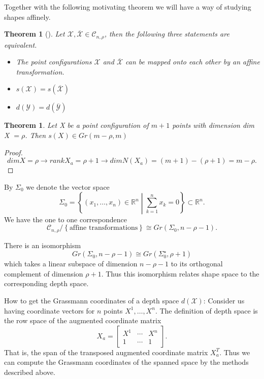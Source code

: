 \documentclass[a4paper,12pt]{book}
\theoremstyle{plain}
\newtheorem{thm}[equation]{Theorem}
\theoremstyle{definition}
\begin{document}
Together with the following motivating theorem we will have a way of studying shapes affinely.
\begin{thm}[\cite{sparr1998}]
	Let \( \mathcal{X}, \overline{\mathcal{X}} \in \mathcal{C}_{n, \rho}\),
	then the following three
	statements are equivalent.
	\begin{itemize}
		\item The point configurations \( \mathcal{X} \) and \( \overline{\mathcal{X}} \) can be
		mapped onto each other by an affine transformation.
		\item \( s(\mathcal{X}) = s(\mathcal{\overline{X}}) \)
		\item \(  d(\mathcal{Y}) =  d(\mathcal{\overline{Y}}) \)
	\end{itemize}
\end{thm}
\begin{thm}
	Let X be a point configuration of \( m + 1 \) points with dimension
	dim X \( = \rho \). Then \( s(X) \in Gr(m - \rho, m) \)
\end{thm}
\begin{proof}
	\[
		dim X = \rho \rightarrow rank X_a = \rho + 1 \rightarrow
		dim N(X_a) = (m + 1) - (\rho + 1) = m - \rho.
	\]
\end{proof}
By \( \Sigma_0 \) we denote the vector space
\[
	\Sigma_0 = \left\{ ( x_1, \ldots, x_n ) \in \mathbb{R}^n \middle| \sum_{k=1}^n x_k = 0 \right\}
	\subset \mathbb{R}^n .
\]
We have the one to one correspondence
\[
	\mathcal{C}_{n,\rho} / \left\{\text{affine transformations} \right\}
	\cong Gr(\Sigma_0, n - \rho - 1).
\]

There is an isomorphism
\[
	Gr(\Sigma_0, n - \rho - 1) \cong Gr(\Sigma_0^\star, \rho + 1)
\]
which takes a linear subspace of dimension \( n - \rho - 1 \) 
to its orthogonal complement of
dimension \( \rho + 1 \).
Thus this isomorphism relates shape space to the corresponding depth space.

How to get the Grassmann coordinates of a depth space \( d( \mathcal{X} ) \):
Consider us having coordinate vectors for 
\( n \) points \(  X^1, \ldots, X^n \). The definition
of depth space is the row space of the augmented coordinate matrix
\[
	X_a = \begin{bmatrix}
		X^1 & \cdots & X^n \\
		1 & \cdots & 1
	\end{bmatrix}.
\]
That is, the span of the transposed augmented coordinate matrix \( X_a^T \). 
Thus we can compute
the Grassmann coordinates of the spanned space by the methods described above.
\end{document}
